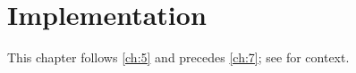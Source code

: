 \chapter{Implementation}\label{ch:6}
\kant[6-10]

This chapter follows \cref{ch:5} and precedes \cref{ch:7}; see \citep{ch6-1,ch6-3} for context.
